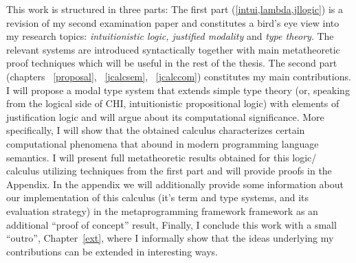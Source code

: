            This work  is structured in three parts: 
           The first part (\cref{intui,lambda,jllogic}) is a revision of my second examination paper and constitutes 
           a bird's eye view into my 
           research topics:  
           \emph{intuitionistic logic, justified modality} and \emph{type theory}. 
           The relevant systems are introduced syntactically together with main 
            metatheoretic proof techniques which will be useful 
           in the rest of the thesis.
           The second part (chapters ~\ref{proposal}, ~\ref{jcalcsem}, ~\ref{jcalccom}) 
           constitutes my main contributions.
           I will propose  
           a modal type system that extends simple type theory
            (or, speaking from the logical side of \ac{CHI}, 
           intuitionistic propositional logic) with elements of
            justification logic and will argue about its computational significance. 
            More specifically, I will show  
           that the obtained calculus characterizes  certain 
           computational phenomena that abound in modern programming language semantics. 
           I will present full metatheoretic
           results obtained for this logic/ calculus utilizing techniques from the first part 
           and will provide proofs in the Appendix. 
           In the appendix we will additionally provide some information about 
           our implementation of this calculus 
           (it's term and type systems, and its evaluation strategy)
           in the metaprogramming framework  framework  
           as an additional  ``proof of concept'' result,  
           Finally, I conclude this work with a small ``outro'', Chapter~\ref{ext},
           where I informally show that the ideas underlying my contributions 
           can be extended in interesting ways.


